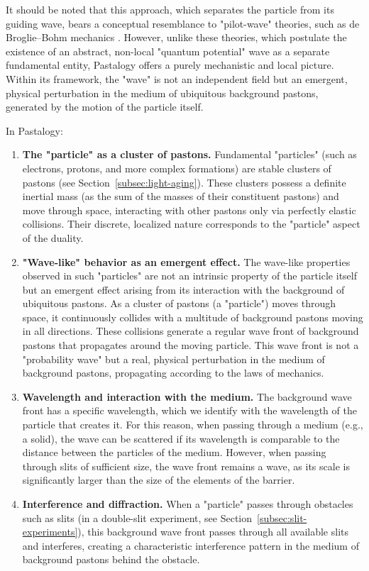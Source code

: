 \documentclass[pdflatex,sn-mathphys-num]{sn-jnl}
\begin{document}
It should be noted that this approach, which separates the particle from its guiding wave, bears a conceptual resemblance to "pilot-wave" theories, such as de Broglie--Bohm mechanics \cite{bohm1952-interpretation}. However, unlike these theories, which postulate the existence of an abstract, non-local "quantum potential" wave as a separate fundamental entity, Pastalogy offers a purely mechanistic and local picture. Within its framework, the "wave" is not an independent field but an emergent, physical perturbation in the medium of ubiquitous background pastons, generated by the motion of the particle itself.

In Pastalogy:
\begin{enumerate}
    \item \textbf{The "particle" as a cluster of pastons.} Fundamental "particles" (such as electrons, protons, and more complex formations) are stable clusters of pastons (see Section~\ref{subsec:light-aging}). These clusters possess a definite inertial mass (as the sum of the masses of their constituent pastons) and move through space, interacting with other pastons only via perfectly elastic collisions. Their discrete, localized nature corresponds to the "particle" aspect of the duality.
    \item \textbf{"Wave-like" behavior as an emergent effect.} The wave-like properties observed in such "particles" are not an intrinsic property of the particle itself but an emergent effect arising from its interaction with the background of ubiquitous pastons. As a cluster of pastons (a "particle") moves through space, it continuously collides with a multitude of background pastons moving in all directions. These collisions generate a regular wave front of background pastons that propagates around the moving particle. This wave front is not a "probability wave" but a real, physical perturbation in the medium of background pastons, propagating according to the laws of mechanics.
    \item \textbf{Wavelength and interaction with the medium.} The background wave front has a specific wavelength, which we identify with the wavelength of the particle that creates it. For this reason, when passing through a medium (e.g., a solid), the wave can be scattered if its wavelength is comparable to the distance between the particles of the medium. However, when passing through slits of sufficient size, the wave front remains a wave, as its scale is significantly larger than the size of the elements of the barrier.
    \item \textbf{Interference and diffraction.} When a "particle" passes through obstacles such as slits (in a double-slit experiment, see Section~\ref{subsec:slit-experiments}), this background wave front passes through all available slits and interferes, creating a characteristic interference pattern in the medium of background pastons behind the obstacle.

\end{enumerate}
\end{document}
